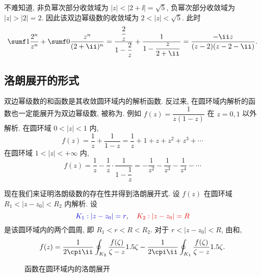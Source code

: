 \begin{solution}
  不难知道, 非负幂次部分收敛域为 $|z|<|2+\ii|=\sqrt5$, 负幂次部分收敛域为 $|z|>|2|=2$. 
  因此该双边幂级数的收敛域为 $2<|z|<\sqrt5$.
  此时
  \[
     \sumf1 \frac{2^n}{z^n}+\sumf0 \frac{z^n}{(2+\ii)^n}
    =\frac{\dfrac2z}{1-\dfrac2z}+\frac1{1-\dfrac z{2+\ii}}
    =\frac{-\ii z}{(z-2)(z-2-\ii)}.
  \]
\end{solution}


\subsection{洛朗展开的形式}

双边幂级数的和函数是其收敛圆环域内的解析函数.
反过来, 在圆环域内解析的函数也一定能展开为双边幂级数, 被称为.
例如 $f(z)=\dfrac1{z(1-z)}$ 在 $z=0,1$ 以外解析.
在圆环域 $0<|z|<1$ 内,
\[f(z)=\frac1z+\frac1{1-z}=\frac1z+1+z+z^2+z^3+\cdots\]
在圆环域 $1<|z|<+\infty$ 内,
\[f(z)=\frac1z-\frac1z\cdot\frac1{1-\dfrac1z}=-\frac1{z^2}-\frac1{z^3}-\frac1{z^4}-\cdots\]

现在我们来证明洛朗级数的存在性并得到洛朗展开式.
设 $f(z)$ 在圆环域 $R_1<|z-z_0|<R_2$ 内解析.
设
\[
  \emphn{K_1:|z-z_0|=r},\quad \alertn{K_2:|z-z_0|=R}
\]
是该圆环域内的两个圆周, 即 $R_1<r<R<R_2$. 
对于 $r<|z-z_0|<R$, 由\thmCCC 和\thmCIH,
\[
   f(z)
  =\frac1{2\cpi\ii}\oint_{K_2}\frac{f(\zeta)}{\zeta-z}\d\zeta
  -\frac1{2\cpi\ii}\oint_{K_1}\frac{f(\zeta)}{\zeta-z}\d\zeta.
\]

\begin{figure}[!htb]
  \centering
  \caption{函数在圆环域内的洛朗展开}
\end{figure}

